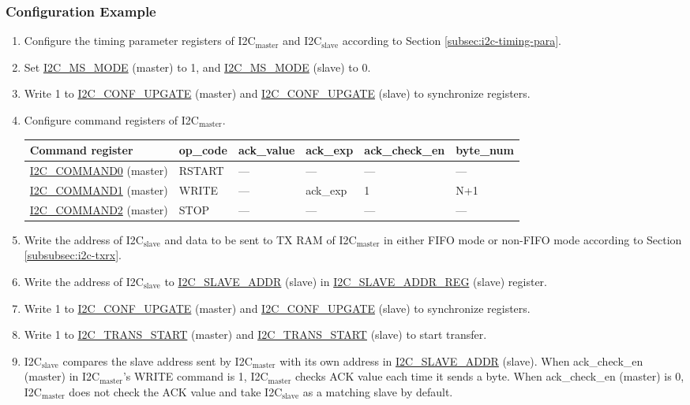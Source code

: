 \documentclass[main\_\_EN.tex]{subfiles}
\begin{document}
\subsubsection{Configuration Example}

\begin{enumerate}
\item Configure the timing parameter registers of I2C$_\text{master}$ and I2C$_\text{slave}$ according to Section \ref{subsec:i2c-timing-para}.
\item Set \hyperref[fielddesc:I2CMSMODE]{I2C\_MS\_MODE} (master) to 1, and \hyperref[fielddesc:I2CMSMODE]{I2C\_MS\_MODE} (slave) to 0.
\item Write 1 to \hyperref[fielddesc:I2CCONFUPGATE]{I2C\_CONF\_UPGATE} (master) and \hyperref[fielddesc:I2CCONFUPGATE]{I2C\_CONF\_UPGATE} (slave) to synchronize registers.
\item Configure command registers of I2C$_\text{master}$.
\newpage
\begin{longtable}{ | p{5cm} | p{1.5cm} | p{1.5cm} | p{1.5cm} |p{2.5cm} | p{1.5cm} |}
\hline\rowcolor{lightgray}
Command register& op\_code & ack\_value&ack\_exp&ack\_check\_en&byte\_num  \\ \hline
\hyperref[fielddesc:I2CCOMMAND0]{I2C\_COMMAND0} (master)& RSTART& ---&---&---&---  \\ \hline
\hyperref[fielddesc:I2CCOMMAND1]{I2C\_COMMAND1} (master)& WRITE& ---&ack\_exp&1&N+1  \\ \hline
\hyperref[fielddesc:I2CCOMMAND2]{I2C\_COMMAND2} (master)& STOP& ---&---&---&---  \\ \hline
\end{longtable}

\item Write the address of I2C$_\text{slave}$ and data to be sent to TX RAM of I2C$_\text{master}$ in either FIFO mode or non-FIFO mode according to Section \ref{subsubsec:i2c-txrx}.
\item Write the address of I2C$_\text{slave}$ to \hyperref[fielddesc:I2CSLAVEADDR]{I2C\_SLAVE\_ADDR} (slave) in \hyperref[regdesc:I2CSLAVEADDRREG]{I2C\_SLAVE\_ADDR\_REG} (slave) register.
\item Write 1 to \hyperref[fielddesc:I2CCONFUPGATE]{I2C\_CONF\_UPGATE} (master) and \hyperref[fielddesc:I2CCONFUPGATE]{I2C\_CONF\_UPGATE} (slave) to synchronize registers.
\item Write 1 to \hyperref[fielddesc:I2CTRANSSTART]{I2C\_TRANS\_START} (master) and \hyperref[fielddesc:I2CTRANSSTART]{I2C\_TRANS\_START} (slave) to start transfer.
\item I2C$_\text{slave}$ compares the slave address sent by I2C$_\text{master}$ with its own address in \hyperref[fielddesc:I2CSLAVEADDR]{I2C\_SLAVE\_ADDR} (slave). When ack\_check\_en (master) in I2C$_\text{master}$'s WRITE command is 1, I2C$_\text{master}$ checks ACK value each time it sends a byte. When ack\_check\_en (master) is 0, I2C$_\text{master}$ does not check the ACK value and take I2C$_\text{slave}$ as a matching slave by default.


\end{enumerate}
\end{document}
